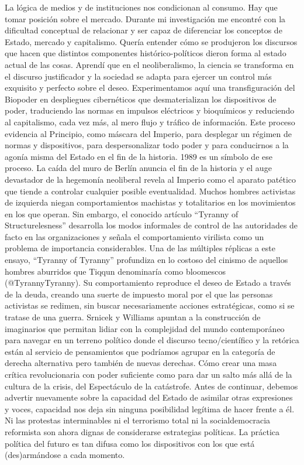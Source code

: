 \documentclass[
]{article}
\begin{document}
La lógica de medios y de instituciones nos condicionan al consumo. Hay
que tomar posición sobre el mercado. Durante mi investigación me
encontré con la dificultad conceptual de relacionar y ser capaz de
diferenciar los conceptos de Estado, mercado y capitalismo. Quería
entender cómo se produjeron los discursos que hacen que distintos
componentes histórico-políticos dieron forma al estado actual de las
cosas. Aprendí que en el neoliberalismo, la ciencia se transforma en el
discurso justificador y la sociedad se adapta para ejercer un control
más exquisito y perfecto sobre el deseo. Experimentamos aquí una
transfiguración del Biopoder en despliegues cibernéticos que
desmaterializan los dispositivos de poder, traduciendo las normas en
impulsos eléctricos y bioquímicos y reduciendo al capitalismo, cada vez
más, al mero flujo y tráfico de información. Este proceso evidencia al
Principio, como máscara del Imperio, para desplegar un régimen de normas
y dispositivos, para despersonalizar todo poder y para conducirnos a la
agonía misma del Estado en el fin de la historia. 1989 es un símbolo de
ese proceso. La caída del muro de Berlín anuncia el fin de la historia y
el auge devastador de la hegemonía neoliberal revela al Imperio como el
aparato patético que tiende a controlar cualquier posible eventualidad.
Muchos hombres activistas de izquierda niegan comportamientos machistas
y totalitarios en los movimientos en los que operan. Sin embargo, el
conocido artículo ``Tyranny of Structurelesness'' desarrolla los modos
informales de control de las autoridades de facto en las organizaciones
y señala el comportamiento virilista como un problema de importancia
considerables. Una de las múltiples réplicas a este ensayo, ``Tyranny of
Tyranny'' profundiza en lo costoso del cinismo de aquellos hombres
aburridos que Tiqqun denominaría como bloomescos (@TyrannyTyranny). Su
comportamiento reproduce el deseo de Estado a través de la deuda,
creando una suerte de impuesto moral por el que las personas activistas
se redimen, sin buscar necesariamente acciones estratégicas, como si se
tratase de una guerra. Srnicek y Williams apuntan a la construcción de
imaginarios que permitan lidiar con la complejidad del mundo
contemporáneo para navegar en un terreno político donde el discurso
tecno/científico y la retórica están al servicio de pensamientos que
podríamos agrupar en la categoría de derecha alternativa pero también de
nuevas derechas. Cómo crear una masa crítica revolucionaria con poder
suficiente como para dar un salto más allá de la cultura de la crisis,
del Espectáculo de la catástrofe. Antes de continuar, debemos advertir
nuevamente sobre la capacidad del Estado de asimilar otras expresiones y
voces, capacidad nos deja sin ninguna posibilidad legítima de hacer
frente a él. Ni las protestas interminables ni el terrorismo total ni la
socialdemocracia reformista son ahora dignas de considerarse estrategias
políticas. La práctica política del futuro es tan difusa como los
dispositivos con los que está (des)armándose a cada momento.
\end{document}
